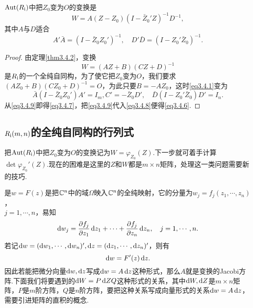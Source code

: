 \begin{theorem}\label{thm3.4.5}
	$\Aut(R_{\text{\uppercase\expandafter{\romannumeral1}}})$中把$Z_0$变为$O$的变换是
	\begin{equation}\label{eq3.4.6}
		W=A(Z-Z_0)(I-\bar{Z}_0' Z)^{-1}D^{-1},
	\end{equation}
其中$A$与$D$适合
\begin{equation}\label{eq3.4.7}
	A'\bar{A}=(I-\bar{Z}_0Z_0')^{-1},\quad D'\bar{D}=(I-Z_0'\bar{Z}_0)^{-1}.
\end{equation}
\end{theorem}
\begin{proof}
	由定理\ref{thm3.4.2}，变换
	\begin{equation}\label{eq3.4.8}
		W=(AZ+B)(CZ+D)^{-1}
	\end{equation}
是$R_{\text{\uppercase\expandafter{\romannumeral1}}}$的一个全纯自同构，为了使它把$Z_0$变为$O$，我们要求$(AZ_0+B)(CZ_0+D)^{-1}=O$，为此只要$B=-AZ_0$，这时\eqref{eq3.4.1}变为
\begin{equation}\label{eq3.4.9}
	\bar{A}(I-\bar{Z}_0 Z_0')A'=I_m,C'=-\bar{Z}_0 D',\quad \bar{D}(I-Z_0'\bar{Z}_0)D'=I_n.
\end{equation}
从\eqref{eq3.4.9}即得\eqref{eq3.4.7}，把\eqref{eq3.4.9}代入\eqref{eq3.4.8}便得\eqref{eq3.4.6}.
\end{proof}
\subsection{$R_{\text{\uppercase\expandafter{\romannumeral1}}}(m,n)$的全纯自同构的行列式}
把$\Aut(R_{\text{\uppercase\expandafter{\romannumeral1}}})$中把$Z_0$变为$O$的变换记为$W=\varphi_{Z_0}(Z)$.下一步就可着手计算\\$\det\varphi_{Z_0}'(Z)$.现在的困难是这里的$Z$和$W$都是$m\times n$矩阵，处理这一类问题需要新的技巧.

是$w=F(z)$是把$\mathbb C^n$中的域$\Omega$映入$\mathbb C^n$的全纯映射，它的分量为$w_j=f_j(z_1,\cdots,z_n)$，\\
$j=1,\cdots,n$，易知
\[\mathop{}\!\mathrm{d} w_j=\frac{\partial f_j}{\partial z_1}\mathop{}\!\mathrm{d} z_1+\cdots+\frac{\partial f_j}{\partial z_n}\mathop{}\!\mathrm{d} z_n,\quad j=1,\cdots,n.\]
若记$\mathop{}\!\mathrm{d} w=(\mathop{}\!\mathrm{d} w_1,\cdots,\mathop{}\!\mathrm{d} w_n)',\mathop{}\!\mathrm{d} z=(\mathop{}\!\mathrm{d} z_1,\cdots,\mathop{}\!\mathrm{d} z_n)'$，则有
\[\mathop{}\!\mathrm{d} w=F'(z)\mathop{}\!\mathrm{d} z.\]
因此若能把微分向量$\mathop{}\!\mathrm{d} w,\mathop{}\!\mathrm{d} z$写成$\mathop{}\!\mathrm{d} w=A\mathop{}\!\mathrm{d} z$这种形式，那么$A$就是变换的Jacobi方阵.下面我们将要遇到的$\mathop{}\!\mathrm{d} W=P\mathop{}\!\mathrm{d} ZQ$这种形式的关系，其中$\mathop{}\!\mathrm{d} W,\mathop{}\!\mathrm{d} Z$是$m\times n$矩阵，$P$是$m$阶方阵，$Q$是$n$阶方阵，要把这种关系写成向量形式的关系$\mathop{}\!\mathrm{d} w=A\mathop{}\!\mathrm{d} z$，需要引进矩阵的直积的概念.

